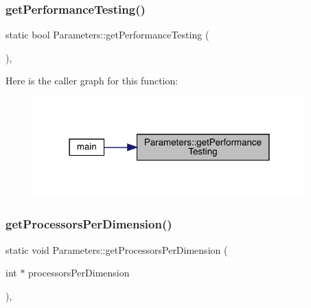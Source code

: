 \subsubsection{\texorpdfstring{getPerformanceTesting()}{getPerformanceTesting()}}
{\footnotesize\ttfamily static bool Parameters\+::get\+Performance\+Testing (\begin{DoxyParamCaption}{ }\end{DoxyParamCaption})\hspace{0.3cm}{\ttfamily [inline]}, {\ttfamily [static]}}

Here is the caller graph for this function\+:\nopagebreak
\begin{figure}[H]
\begin{center}
\leavevmode
\includegraphics[width=298pt]{class_parameters_a778a2311c27854392c34c15bd4ea19f8_icgraph}
\end{center}
\end{figure}
\mbox{\label{class_parameters_a6b13faa642ebaf458203ae111a536d7a}} 
\subsubsection{\texorpdfstring{getProcessorsPerDimension()}{getProcessorsPerDimension()}}
{\footnotesize\ttfamily static void Parameters\+::get\+Processors\+Per\+Dimension (\begin{DoxyParamCaption}\item[{int $\ast$}]{processors\+Per\+Dimension }\end{DoxyParamCaption})\hspace{0.3cm}{\ttfamily [inline]}, {\ttfamily [static]}}

\mbox{\label{class_parameters_a92d9e73e333b01745747e55d9ae4f7cc}} 
